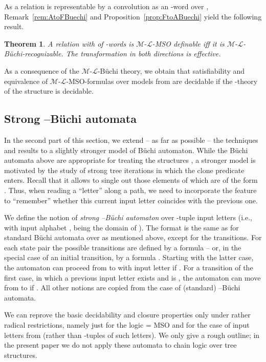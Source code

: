 \documentclass[copyright,creativecommons]{eptcs}
\newtheorem{theorem}{Theorem}
\theoremstyle{plain}
\theoremstyle{nonumberplain}
\newcommand{\m}{\ensuremath{\mathcal{M}}}
\newcommand{\el}{\ensuremath{\mathcal{L}}}
\newcommand{\ml}{\ensuremath{\m\textrm{-}\el}}
\begin{document}
As a relation  is representable by a convolution as an -word over , Remark~\ref{rem:AtoFBuechi} and Proposition~\ref{prop:FtoABuechi} yield the following result.

\begin{theorem}\label{theo:maintheobuechi}
A relation  with  of -words is \ml-MSO definable  iff 
it is \ml-B{\"u}chi-recognizable. The transformation in both directions is effective.
\end{theorem}

As a consequence of the \ml-B{\"u}chi theory, we obtain that satisfiability and 
equivalence of \ml-MSO-formulas over models from  are 
decidable if the -theory of the structure  is decidable.



\subsection{Strong --B\"uchi automata}



In the second part of this section, we extend -- as far as possible -- 
the techniques and results to a 
slightly stronger model of B\"uchi automaton. While the B\"uchi automata above 
are appropriate for treating the structures , a stronger model is motivated by 
the study of strong tree iterations  in which the clone predicate 
enters. Recall that it allows to single out those elements of  which are 
of the form . Thus, when reading a ``letter''  along a path, we need to incorporate 
the feature to ``remember'' whether this current input letter  coincides with the 
previous one.  

We define the notion of {\em strong --B\"uchi automaton} over 
-tuple input letters (i.e., with input alphabet ,  being the domain of ). The format is the same as for standard B{\"u}chi automata over  as mentioned above, except for the transitions. 
For each state pair  
 the possible transitions are defined by a formula  -- or, in the special case of an initial transition, by 
a formula . Starting with the latter case, 
the automaton can proceed from  to  with input letter  
if . For a transition of the first case, 
in which a previous input letter exists and is , 
the automaton can move from  to  if .
All other notions are copied from the case of (standard) --B\"uchi automata. 

We can reprove the basic decidability and closure properties only under rather radical 
restrictions, namely just for the logic  = MSO 
and for the case of input letters from  (rather than -tuples of such 
letters). We only give a rough outline; in the present paper 
we do not apply these automata to chain logic over tree structures. 
  
\end{document}
